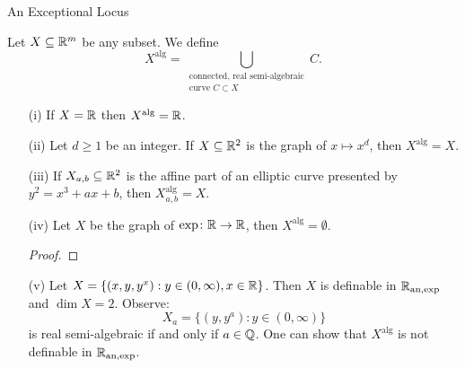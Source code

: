 \documentclass{beamer}
\begin{document}
\begin{frame}{An Exceptional Locus}
  \begin{definition}
    Let $X\subseteq{\mathbb{R}}^m$ be any subset. We define
    \begin{equation*}
      X^{\mathrm{alg}} = \bigcup_{\substack{\text{connected, real
            semi-algebraic}\\ \text{curve }C\subset X}} C.
    \end{equation*}
  \end{definition}
  
  \begin{example}
    \begin{enumerate}
    \item [(i)] If $X={\mathbb{R}}$ then $X^{\mathrm{alg}}={\mathbb{R}}$.
    \item[(ii)] Let $d\ge 1$ be an integer. If
      $X\subseteq{\mathbb{R}}^2$ is the graph of $x\mapsto x^d$, then
      $X^{\mathrm{alg}}=X$.
      
    \item[(iii)] If $X_{a,b} \subseteq{\mathbb{R}}^2$ is the affine part of an
      elliptic curve presented by $y^2=x^3+ax+b$, then
      $X_{a,b}^{\mathrm{alg}}=X$.
    \end{enumerate}
  \end{example}
\end{frame}

\begin{frame}
  \begin{example}[Continued]
    \begin{enumerate}
\item[(iv)] Let $X$ be  the graph of
      $\exp\colon{\mathbb{R}}\rightarrow{\mathbb{R}}$, then
      $X^{\mathrm{alg}}=\emptyset$.
      \begin{minipage}{0.9\linewidth}
      \begin{proof}
        \vspace{2.25cm}
      \end{proof}  
      \end{minipage}
      
    \item [(v)] Let $X = \{(x,y,y^x) : y\in (0,\infty), x\in{\mathbb{R}}\}$. Then
      $X$ is definable in ${{\mathbb{R}}_{\mathrm{an,exp}}}$ and $\dim X = 2$.
      Observe:
      \vspace{-.3cm}
      $$X_a=\{(y,y^a) : y\in (0,\infty)\}$$
      is real
      semi-algebraic if and only if 
      $a\in{\mathbb{Q}}$.      One can show that
      $X^{\mathrm{alg}}$ is \alert{not} definable in
      ${{\mathbb{R}}_{\mathrm{an,exp}}}$.      
    \end{enumerate}
  \end{example}
\end{frame}
\end{document}
